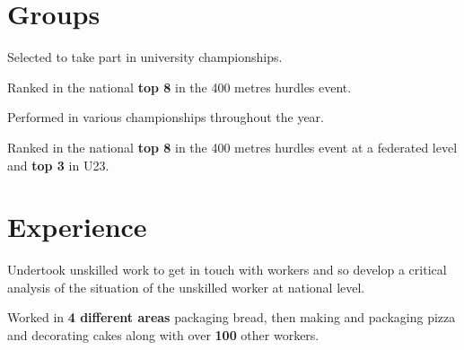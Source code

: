 \documentclass[]{deedy-resume-openfont}
\begin{document}
\begin{minipage}[t]{0.66\textwidth}
\section{Groups} 
\begin{tightemize}
\item Selected to take part in university championships.
\item Ranked in the national \textbf{top 8} in the 400 metres hurdles event.
\end{tightemize}
\sectionsep

\begin{tightemize}
\item Performed in various championships throughout the year.
\item Ranked in the national \textbf{top 8} in the 400 metres hurdles event at a federated level and \textbf{top 3} in U23.
\end{tightemize}

\vspace{\topsep}
\section{Experience}
\begin{tightemize}
\item Undertook unskilled work to get in touch with workers and so develop a critical analysis of the situation of the unskilled worker at national level.
\item Worked in \textbf{4 different areas} packaging bread, then making and packaging pizza and decorating cakes along with over \textbf{100} other workers.
\end{tightemize}
\sectionsep

\end{minipage} 
\end{document}
